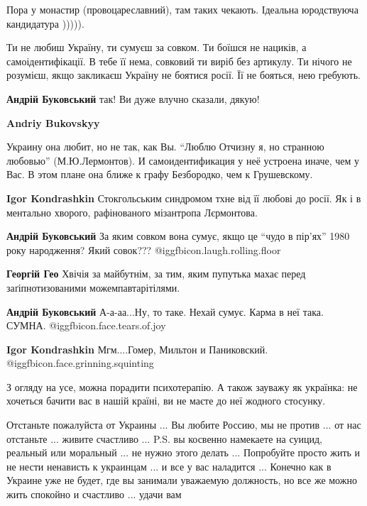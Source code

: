 \begin{itemize}
Пора у монастир (провоцареславний), там таких чекають. Ідеальна юродствуюча кандидатура ))))).

Ти не любиш Україну, ти сумуєш за совком.
Ти боїшся не нациків, а самоідентифікації. В тебе її нема, совковий ти виріб без артикулу.
Ти нічого не розумієш, якщо закликаєш Україну не боятися росії. Її не бояться, нею гребують.

\begin{itemize} %
\textbf{Андрій Буковський} так!
Ви дуже влучно сказали, дякую!

\textbf{Andriy Bukovskyy} 

Украину она любит, но не так, как Вы. \enquote{Люблю Отчизну я, но странною любовью}
(М.Ю.Лермонтов). И самоидентификация у неё устроена иначе, чем у Вас. В этом
плане она ближе к графу Безбородко, чем к Грушевскому.

\textbf{Igor Kondrashkin}
Стокгольським синдромом тхне від її любові до росії. Як і в ментально хворого, рафінованого мізантропа Лєрмонтова.

\textbf{Андрій Буковський} За яким совком вона сумує, якщо це \enquote{чудо в пір'ях} 1980 року народження? Який совок???  @igg{fbicon.laugh.rolling.floor} 

\textbf{Георгій Гео} Хвічія за майбутнім, за тим, яким пупутька махає перед заґіпнотизованими можемпавтарітілями.

\textbf{Андрій Буковський} А-а-аа...Ну, то таке. Нехай сумує. Карма в неї така. СУМНА.  @igg{fbicon.face.tears.of.joy} 

\textbf{Igor Kondrashkin} Мгм....Гомер, Мильтон и Паниковский.  @igg{fbicon.face.grinning.squinting} 
\end{itemize} %

З огляду на усе, можна порадити психотерапію.
А також зауважу як українка: не хочеться бачити вас в нашій країні, ви не маєте до неї жодного стосунку.


Отстаньте пожалуйста от Украины ... Вы любите Россию, мы не против ... от нас
отстаньте ... живите счастливо ... P.S. вы косвенно намекаете на суицид,
реальный или моральный ... не нужно этого делать ... Попробуйте просто жить и
не нести ненависть к украинцам ... и все у вас наладится ... Конечно как в
Украине уже не будет, где вы занимали уважаемую должность, но все же можно жить
спокойно и счастливо ... удачи вам



\end{itemize}
